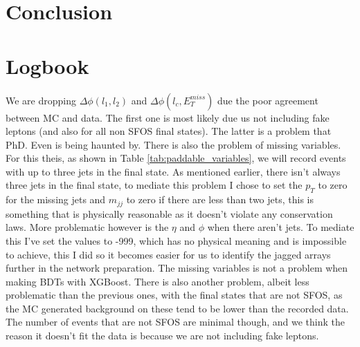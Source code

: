 \documentclass[12pt, a4paper]{book}
\begin{document}
\chapter{Conclusion}\label{chap:conclusion}


\clearpage


\appendix
























\chapter*{Logbook}

We are dropping $\Delta\phi(l_1,l_2)$ and $\Delta\phi(l_c,E_T^{miss})$ due the poor agreement between MC and data. The first one is most likely due us not including fake leptons (and also for all non SFOS final states). The latter is a problem that PhD. Even is being haunted by. 
There is also the problem of missing variables. For this theis, as shown in Table \ref{tab:paddable_variables}, we will record events with up to three jets in the final state. As mentioned earlier, there isn't 
always three jets in the final state, to mediate this problem I chose to set the $p_T$ to zero for the missing jets and $m_{jj}$ to zero if there are less than two jets, this is something that is physically reasonable as it doesn't violate any conservation laws. 
More problematic however is the $\eta$ and $\phi$ when there aren't jets. To mediate this I've set the values to -999, which has no physical meaning and is impossible to achieve, this I did so it becomes easier for us to identify the jagged arrays further in the network preparation. 
The missing variables is not a problem when making BDTs with XGBoost. There is also another problem, albeit less problematic than the previous ones, with the final states that are not SFOS, as the MC generated background 
on these tend to be lower than the recorded data. The number of events that are not SFOS are minimal though, and we think the reason it doesn't fit the data is because we are not including fake leptons. 
\end{document}
